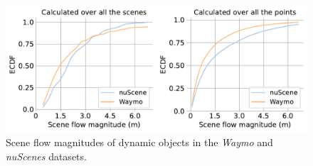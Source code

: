 \begin{figure}[t!]
     \centering
        \includegraphics[width=1.0\columnwidth]{figs/figure/motion.pdf}
       \caption{Scene flow magnitudes of dynamic objects in the \emph{Waymo} and \emph{nuScenes} datasets.}
   \label{fig:motion_ecdf}
\end{figure}